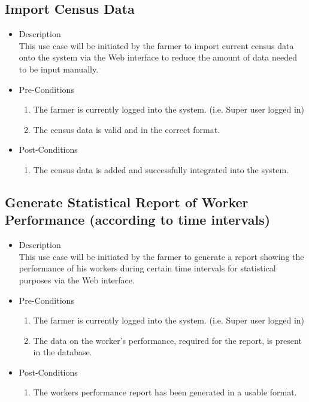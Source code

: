 \documentclass[11pt,fleqn]{book} %
\begin{document}
		\subsection{Import Census Data}
		\begin{itemize}
			\item Description\\
			This use case will be initiated by the farmer to import current census data onto the system via the Web interface to reduce the amount of data needed to be input manually.
			\item Pre-Conditions
			\begin{enumerate}
				\item The farmer is currently logged into the system. (i.e. Super user logged in)
				\item The census data is valid and in the correct format.								
			\end{enumerate}
			\item Post-Conditions
			\begin{enumerate}
				\item The census data is added and successfully integrated into the system.
			\end{enumerate}
		\end{itemize}
		
		\subsection{Generate Statistical Report of Worker Performance (according to time intervals)}
		\begin{itemize}
			\item Description\\
			This use case will be initiated by the farmer to generate a report showing the performance of his workers during certain time intervals for statistical purposes via the Web interface.
			\item Pre-Conditions
			\begin{enumerate}
				\item The farmer is currently logged into the system. (i.e. Super user logged in)
				\item The data on the worker’s performance, required for the report, is present in the database.		
			\end{enumerate}
			\item Post-Conditions
			\begin{enumerate}
				\item The workers performance report has been generated in a usable format.
			\end{enumerate}
		\end{itemize}
		
\end{document}
